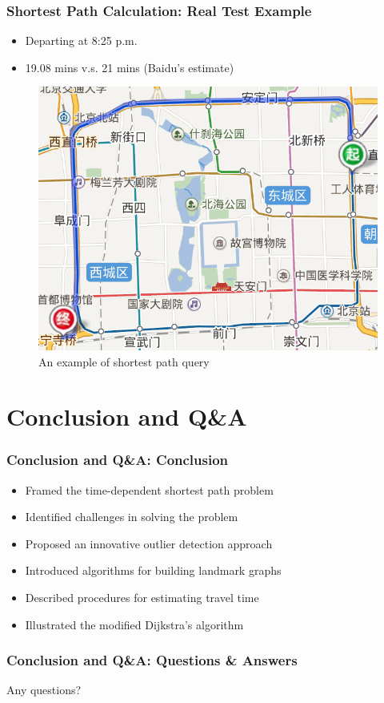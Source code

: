 \documentclass{beamer}
\theoremstyle{definition}
\begin{document}
\begin{frame}
\frametitle{Shortest Path Calculation: Real Test Example}
\begin{itemize}
	\item Departing at 8:25 p.m.
	\item 19.08 mins v.s. 21 mins (Baidu's estimate)
\end{itemize}

\begin{figure}[h!]
\includegraphics[scale=0.5]{shortest_path}
\centering
\caption{An example of shortest path query}\label{Fig:test_eg}
\end{figure}

\end{frame}

\section{Conclusion and Q\&A}
\begin{frame}
\frametitle{Conclusion and Q\&A: Conclusion}
\begin{itemize}
	\item <1-> Framed the time-dependent shortest path problem
	\item <2-> Identified challenges in solving the problem
	\item <3-> Proposed an innovative outlier detection approach
	\item <4-> Introduced algorithms for building landmark graphs
	\item <5-> Described procedures for estimating travel time
	\item <6-> Illustrated the modified Dijkstra's algorithm
\end{itemize}
\end{frame}

\begin{frame}
\frametitle{Conclusion and Q\&A: Questions \& Answers}
\begin{center}
\huge Any questions?
\end{center}
\end{frame}
\end{document}
